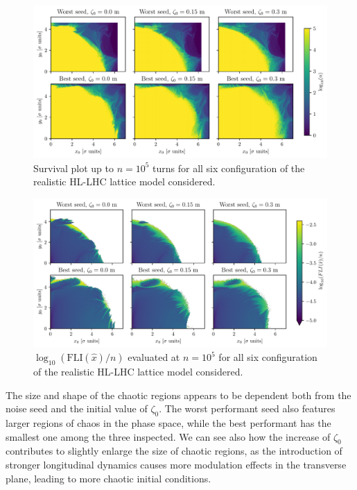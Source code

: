 \begin{figure}
    \centering
    \includegraphics[width=1.0\textwidth]{6_lhc_dynamic_indicators/figs/stability.pdf}
    \caption{Survival plot up to $n=10^5$ turns for all six configuration of the realistic HL-LHC lattice model considered.}
    \label{fig:true_survivors}
\end{figure}

\begin{figure}
    \centering
    \includegraphics[width=1.0\textwidth]{6_lhc_dynamic_indicators/figs/fli_all.pdf}
    \caption{$\log_{10}(\mathrm{FLI}(\hat{x})/n)$ evaluated at $n=10^5$ for all six configuration of the realistic HL-LHC lattice model considered.}
    \label{fig:fli_all}
\end{figure}

The size and shape of the chaotic regions appears to be dependent both from the noise seed and the initial value of $\zeta_0$. The worst performant seed also features larger regions of chaos in the phase space, while the best performant has the smallest one among the three inspected. We can see also how the increase of $\zeta_0$ contributes to slightly enlarge the size of chaotic regions, as the introduction of stronger longitudinal dynamics causes more modulation effects in the transverse plane, leading to more chaotic initial conditions. 

